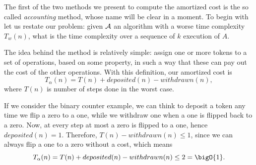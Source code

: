 \documentclass{subfiles}
\begin{document}
    The first of the two methods we present to compute the amortized cost is the so called
        \emph{accounting} method, whose name will be clear in a moment.
        To begin with let us restate our problem: given \(\mathcal{A}\) an algorithm with a 
        worse time complexity \(T_{w}(n)\), what is the time complexity over a 
        sequence of \(k\) execution of \(A\).

    The idea behind the method is relatively simple: assign one or more tokens to a set of operations,
        based on some property, in such a way that these can pay out the cost of the other operations.
        With this definition, our amortized cost is 
        \[
            T_{\alpha}(n) = T(n) + deposited(n) - withdrawn(n),
        \]
        where \(T(n)\) is number of steps done in the worst case.


    If we consider the binary counter example, we can think to deposit a token any time 
        we flip a zero to a one, while we withdraw one when a one is flipped back to a zero.
        Now, at every step at most a zero is flipped to a one, hence \(deposited(n) = 1\).
        Therefore, \(T(n) - withdrawn(n) \le 1\), since we can always flip a one to a zero without a cost,
        which means 
        \[
            T_{\alpha}(n) = T(n) + deposited(n) - withdrawn(n) \le 2 = \bigO{1}.
        \]
\end{document}
